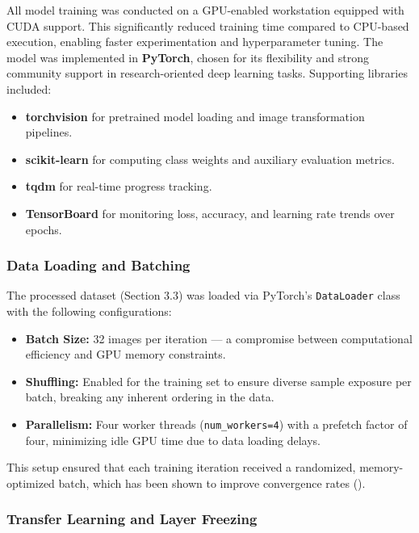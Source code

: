 \documentclass[
  12pt,
  oneside]{article}
\providecommand{\tightlist}{%
  \setlength{\itemsep}{0pt}\setlength{\parskip}{0pt}}
\begin{document}
All model training was conducted on a GPU-enabled workstation equipped
with CUDA support. This significantly reduced training time compared to
CPU-based execution, enabling faster experimentation and hyperparameter
tuning. The model was implemented in \textbf{PyTorch}, chosen for its
flexibility and strong community support in research-oriented deep
learning tasks. Supporting libraries included:

\begin{itemize}
\tightlist
\item
  \textbf{torchvision} for pretrained model loading and image
  transformation pipelines.
\item
  \textbf{scikit-learn} for computing class weights and auxiliary
  evaluation metrics.
\item
  \textbf{tqdm} for real-time progress tracking.
\item
  \textbf{TensorBoard} for monitoring loss, accuracy, and learning rate
  trends over epochs.
\end{itemize}

\subsubsection{Data Loading and
Batching}\label{data-loading-and-batching}

The processed dataset (Section 3.3) was loaded via PyTorch's
\texttt{DataLoader} class with the following configurations:

\begin{itemize}
\tightlist
\item
  \textbf{Batch Size:} 32 images per iteration --- a compromise between
  computational efficiency and GPU memory constraints.
\item
  \textbf{Shuffling:} Enabled for the training set to ensure diverse
  sample exposure per batch, breaking any inherent ordering in the data.
\item
  \textbf{Parallelism:} Four worker threads (\texttt{num\_workers=4})
  with a prefetch factor of four, minimizing idle GPU time due to data
  loading delays.
\end{itemize}

This setup ensured that each training iteration received a randomized,
memory-optimized batch, which has been shown to improve convergence
rates ().

\subsubsection{Transfer Learning and Layer
Freezing}\label{transfer-learning-and-layer-freezing}
\end{document}
